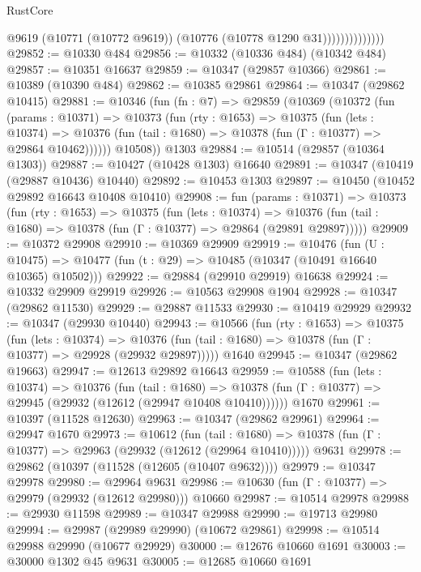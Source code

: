 \begin{lexlean}{RustCore}
\begin{coremodule}
                            @9619
                            (@10771 (@10772 @9619))
                            (@10776 (@10778 @1290 @31))))))))))))))
@29852 := @10330 @484
@29856 := @10332 (@10336 @484) (@10342 @484)
@29857 := @10351 @16637
@29859 := @10347 (@29857 @10366)
@29861 := @10389 (@10390 @484)
@29862 := @10385 @29861
@29864 := @10347 (@29862 @10415)
@29881 := @10346
    (fun (fn : @7) =>
    @29859
      (@10369
        (@10372
          (fun (params : @10371) =>
          @10373
            (fun (rty : @1653) =>
            @10375
              (fun (lets : @10374) =>
              @10376 (fun (tail : @1680) => @10378 (fun (Γ : @10377) => @29864 @10462))))))
        @10508))
    @1303
@29884 := @10514 (@29857 (@10364 @1303))
@29887 := @10427 (@10428 @1303) @16640
@29891 := @10347 (@10419 (@29887 @10436) @10440)
@29892 := @10453 @1303
@29897 := @10450 (@10452 @29892 @16643 @10408 @10410)
@29908 := fun (params : @10371) =>
  @10373
    (fun (rty : @1653) =>
    @10375
      (fun (lets : @10374) =>
      @10376 (fun (tail : @1680) => @10378 (fun (Γ : @10377) => @29864 (@29891 @29897)))))
@29909 := @10372 @29908
@29910 := @10369 @29909
@29919 := @10476
    (fun (U : @10475) => @10477 (fun (t : @29) => @10485 (@10347 (@10491 @16640 @10365) @10502)))
@29922 := @29884 (@29910 @29919) @16638
@29924 := @10332 @29909 @29919
@29926 := @10563 @29908 @1904
@29928 := @10347 (@29862 @11530)
@29929 := @29887 @11533
@29930 := @10419 @29929
@29932 := @10347 (@29930 @10440)
@29943 := @10566
    (fun (rty : @1653) =>
    @10375
      (fun (lets : @10374) =>
      @10376 (fun (tail : @1680) => @10378 (fun (Γ : @10377) => @29928 (@29932 @29897)))))
    @1640
@29945 := @10347 (@29862 @19663)
@29947 := @12613 @29892 @16643
@29959 := @10588
    (fun (lets : @10374) =>
    @10376
      (fun (tail : @1680) =>
      @10378 (fun (Γ : @10377) => @29945 (@29932 (@12612 (@29947 @10408 @10410))))))
    @1670
@29961 := @10397 (@11528 @12630)
@29963 := @10347 (@29862 @29961)
@29964 := @29947 @1670
@29973 := @10612
    (fun (tail : @1680) => @10378 (fun (Γ : @10377) => @29963 (@29932 (@12612 (@29964 @10410)))))
    @9631
@29978 := @29862 (@10397 (@11528 (@12605 (@10407 @9632))))
@29979 := @10347 @29978
@29980 := @29964 @9631
@29986 := @10630 (fun (Γ : @10377) => @29979 (@29932 (@12612 @29980))) @10660
@29987 := @10514 @29978
@29988 := @29930 @11598
@29989 := @10347 @29988
@29990 := @19713 @29980
@29994 := @29987 (@29989 @29990) (@10672 @29861)
@29998 := @10514 @29988 @29990 (@10677 @29929)
@30000 := @12676 @10660 @1691
@30003 := @30000 @1302 @45 @9631
@30005 := @12685 @10660 @1691

\end{coremodule}
\end{lexlean}

